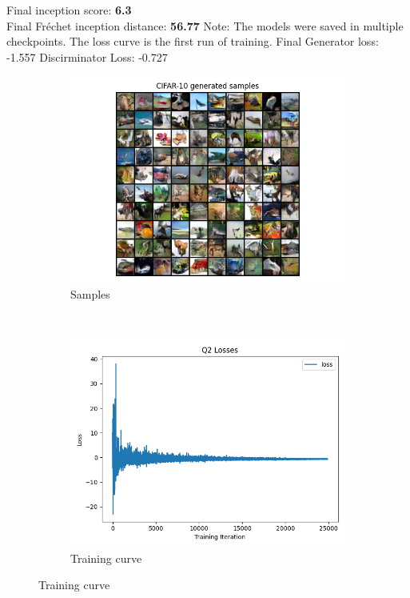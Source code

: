 \documentclass{article}
\begin{document}
Final inception score: \textbf{6.3} \\
Final Fréchet inception distance: \textbf{56.77}
Note: The models were saved in multiple checkpoints. The loss curve is the first run of training.
Final Generator loss: -1.557 Discirminator Loss: -0.727
\begin{figure}[H]
    \centering
    \begin{subfigure}{0.6\textwidth}
        \centering
        \includegraphics[width=\textwidth]{figures/q2_samples.png}
        \caption{Samples}
    \end{subfigure}
    \\
    \begin{subfigure}{0.6\textwidth}
        \centering
        \includegraphics[width=\textwidth]{figures/q2_losses.png}
        \caption{Training curve}
    \end{subfigure}
    
\end{figure}
\end{document}
